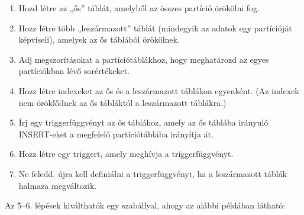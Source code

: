 \documentclass[
  magyar,
]{article}
\providecommand{\tightlist}{%
  \setlength{\itemsep}{0pt}\setlength{\parskip}{0pt}}
\begin{document}
\begin{enumerate}
\def\labelenumi{\arabic{enumi}.}
\tightlist
\item
  Hozd létre az „ős'' táblát, amelyből az összes partíció örökölni fog.
\item
  Hozz létre több „leszármazott'' táblát (mindegyik az adatok egy
  partícióját képviseli), amelyek az ős táblából örökölnek.
\item
  Adj megszorításokat a partíciótáblákhoz, hogy meghatározd az egyes
  partíciókban lévő sorértékeket.
\item
  Hozz létre indexeket az ős és a leszármazott táblákon egyenként. (Az
  indexek nem öröklődnek az ős tábláktól a leszármazott táblákra.)
\item
  Írj egy triggerfüggvényt az ős táblához, amely az ős táblába irányuló
  INSERT-eket a megfelelő partíciótáblába irányítja át.
\item
  Hozz létre egy triggert, amely meghívja a triggerfüggvényt.
\item
  Ne feledd, újra kell definiálni a triggerfüggvényt, ha a leszármazott
  táblák halmaza megváltozik.
\end{enumerate}

Az 5--6. lépések kiválthatók egy szabállyal, ahogy az alábbi példában
látható:
\end{document}

